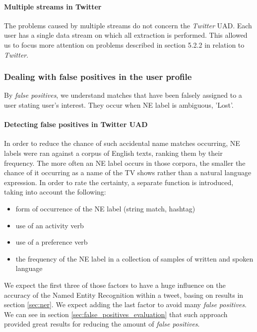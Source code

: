\paragraph{Multiple streams in Twitter}
The problems caused by multiple streams do not concern the \textit{Twitter} UAD. Each user has a single
data stream on which all extraction is performed. This allowed us to focus more attention
on problems described in section 5.2.2 in relation to \textit{Twitter}.

\subsubsection{Dealing with false positives in the user profile}
\label{sec:false_positives}
By \textit{false positives}, we understand matches that have been falsely assigned to a user stating user's interest.
They occur when NE label is ambiguous, \eg 'Lost'.

\paragraph{Detecting false positives in Twitter UAD}

In order to reduce the chance of such accidental name matches occurring, NE labels were ran against a corpus
of English texts, ranking them by their frequency. The more often an NE label occurs in those corpora, the smaller the chance of it occurring as a name of the TV shows rather than a natural language expression. In order to rate the certainty, a separate function is introduced, taking into account the following:

\begin{itemize}
  \item form of occurrence of the NE label (string match, hashtag)
  \item use of an activity verb
  \item use of a preference verb
  \item the frequency of the NE label in a collection of samples of written and spoken language
\end{itemize}

We expect the first three of those factors to have a huge influence on the accuracy of the Named Entity Recognition within
a tweet, basing on results in section \ref{sec:ner}. We expect adding the last factor to avoid many \textit{false
positives}. We can see in section \ref{sec:false_positives_evaluation} that such approach provided great results for
reducing the amount of \textit{false positives}.

